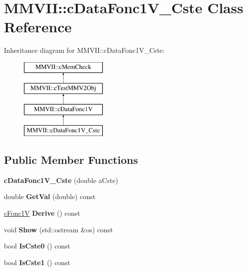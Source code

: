 \hypertarget{classMMVII_1_1cDataFonc1V__Cste}{}\section{M\+M\+V\+II\+:\+:c\+Data\+Fonc1\+V\+\_\+\+Cste Class Reference}
\label{classMMVII_1_1cDataFonc1V__Cste}
Inheritance diagram for M\+M\+V\+II\+:\+:c\+Data\+Fonc1\+V\+\_\+\+Cste\+:\begin{figure}[H]
\begin{center}
\leavevmode
\includegraphics[height=4.000000cm]{classMMVII_1_1cDataFonc1V__Cste}
\end{center}
\end{figure}
\subsection*{Public Member Functions}
\begin{DoxyCompactItemize}
\item 
{\bfseries c\+Data\+Fonc1\+V\+\_\+\+Cste} (double a\+Cste)\hypertarget{classMMVII_1_1cDataFonc1V__Cste_ae88b6b23d1aad3dcf581424820ede9f6}{}\label{classMMVII_1_1cDataFonc1V__Cste_ae88b6b23d1aad3dcf581424820ede9f6}

\item 
double {\bfseries Get\+Val} (double) const \hypertarget{classMMVII_1_1cDataFonc1V__Cste_a519de3620c510895f80e159e7b4083fb}{}\label{classMMVII_1_1cDataFonc1V__Cste_a519de3620c510895f80e159e7b4083fb}

\item 
\hyperlink{classMMVII_1_1cFonc1V}{c\+Fonc1V} {\bfseries Derive} () const \hypertarget{classMMVII_1_1cDataFonc1V__Cste_af29f5a1c3a420bbffa9db7358bd11a6f}{}\label{classMMVII_1_1cDataFonc1V__Cste_af29f5a1c3a420bbffa9db7358bd11a6f}

\item 
void {\bfseries Show} (std\+::ostream \&os) const \hypertarget{classMMVII_1_1cDataFonc1V__Cste_a94e7af3d56795d2f46996ed2764ed548}{}\label{classMMVII_1_1cDataFonc1V__Cste_a94e7af3d56795d2f46996ed2764ed548}

\item 
bool {\bfseries Is\+Cste0} () const \hypertarget{classMMVII_1_1cDataFonc1V__Cste_a0ff6ced7a25e145e9e4f5131150b5a23}{}\label{classMMVII_1_1cDataFonc1V__Cste_a0ff6ced7a25e145e9e4f5131150b5a23}

\item 
bool {\bfseries Is\+Cste1} () const \hypertarget{classMMVII_1_1cDataFonc1V__Cste_a8aee2d89af83408de001ed787433ddef}{}\label{classMMVII_1_1cDataFonc1V__Cste_a8aee2d89af83408de001ed787433ddef}

\end{DoxyCompactItemize}
